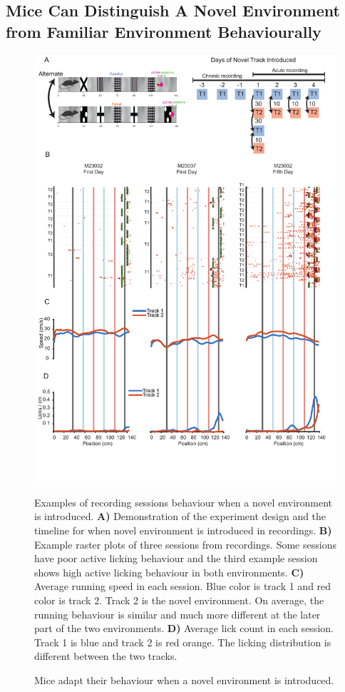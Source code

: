 \subsection{Mice Can Distinguish A Novel Environment from Familiar Environment Behaviourally}
\begin{figure}
    \centering
    \includegraphics[width=1\linewidth]{figures//Chapter 3 Behaviour//Thesis Figures//figure_PDFs/fig6_novel_track_behaviour_examples.pdf}
    \caption{Mice adapt their behaviour when a novel environment is introduced.}

\medskip
\small
Examples of recording sessions behaviour when a novel environment is introduced. \textbf{A)} Demonstration of the experiment design and the timeline for when novel environment is introduced in recordings. \textbf{B)} Example raster plots of three sessions from recordings. Some sessions have poor active licking behaviour and the third example session shows high active licking behaviour in both environments. \textbf{C)} Average running speed in each session. Blue color is track 1 and red color is track 2. Track 2 is the novel environment. On average, the running behaviour is similar and much more different at the later part of the two environments. \textbf{D)}  Average lick count in each session. Track 1 is blue and track 2 is red orange. The licking distribution is different between the two tracks.  
    \label{fig:placeholder}
\end{figure}
